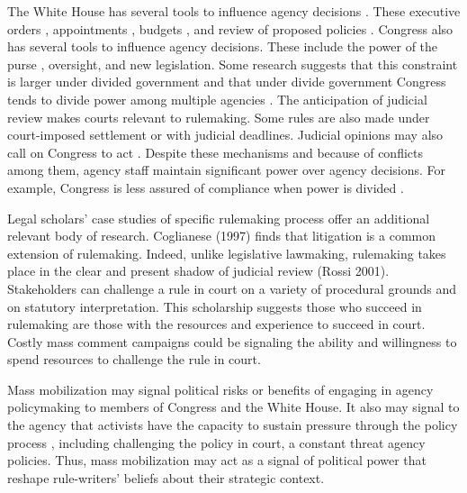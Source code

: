 The White House has several tools to influence agency decisions \citep{Yackee2009a,Simon1954}. These executive orders \citep{Mayer1999}, appointments \citep{Doherty2014,Lewis2008,Wood1988}, budgets \citep{Whittington2003}, and review of proposed policies \citep{HAEDER2015InfluenceBudget,Acs2013}. 
Congress also has several tools to influence agency decisions. These include the power of the purse \citep{Fenno1986,Bolton2015}, oversight, and new legislation. Some research suggests that this constraint is larger under divided government \citep{Yackee2009b} and that under divide government Congress tends to divide power among multiple agencies \citep{Farhang2016}.
The anticipation of judicial review makes courts relevant to rulemaking. Some rules are also made under court-imposed settlement or with judicial deadlines. Judicial opinions may also call on Congress to act \citep{Yaver2017}.
Despite these mechanisms and because of conflicts among them, agency staff maintain significant power over agency decisions. For example, Congress is less assured of compliance when power is divided \citep{Yaver2016}.

Legal scholars' case studies of specific rulemaking process offer an additional relevant body of research. Coglianese (1997) finds that litigation is a common extension of rulemaking. Indeed, unlike legislative lawmaking, rulemaking takes place in the clear and present shadow of judicial review (Rossi 2001). Stakeholders can challenge a rule in court on a variety of procedural grounds and on statutory interpretation. This scholarship suggests those who succeed in rulemaking are those with the resources and experience to succeed in court. Costly mass comment campaigns could be signaling the ability and willingness to spend resources to challenge the rule in court. 

Mass mobilization may signal political risks or benefits of engaging in agency policymaking to members of Congress and the White House. It also may signal to the agency that activists have the capacity to sustain pressure through the policy process \citep{Coglianese2001}, including challenging the policy in court, a constant threat agency policies. Thus, mass mobilization may act as a signal of political power that  reshape rule-writers' beliefs about their strategic context. 



